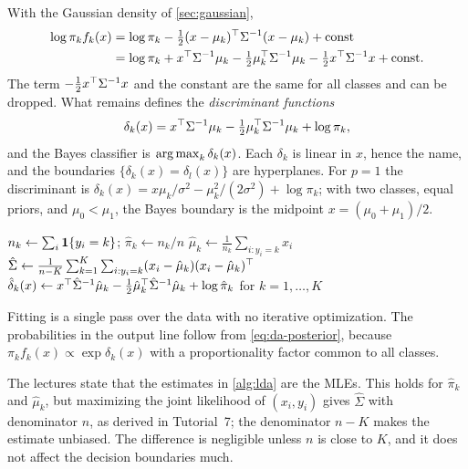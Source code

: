 With the Gaussian density of \cref{sec:gaussian},
\begin{align*}
\log\pi_kf_k(x)&=\log\pi_k-\tfrac12(x-\mu_k)^{\top}\Sigma^{-1}(x-\mu_k)+\text{const}\\
&=\log\pi_k+x^{\top}\Sigma^{-1}\mu_k-\tfrac12\mu_k^{\top}\Sigma^{-1}\mu_k-\tfrac12x^{\top}\Sigma^{-1}x+\text{const}.
\end{align*}
The term $-\frac12x^{\top}\Sigma^{-1}x$ and the constant are the same for all classes and can be dropped. What remains defines the \emph{discriminant functions}
\begin{equation}\label{eq:lda-discriminant}
\delta_k(x)=x^{\top}\Sigma^{-1}\mu_k-\tfrac12\mu_k^{\top}\Sigma^{-1}\mu_k+\log\pi_k,
\end{equation}
and the Bayes classifier is $\operatorname*{arg\,max}_k\delta_k(x)$. Each $\delta_k$ is linear in $x$, hence the name, and the boundaries $\{\delta_k(x)=\delta_l(x)\}$ are hyperplanes. For $p=1$ the discriminant is $\delta_k(x)=x\mu_k/\sigma^2-\mu_k^2/(2\sigma^2)+\log\pi_k$; with two classes, equal priors, and $\mu_0<\mu_1$, the Bayes boundary is the midpoint $x=(\mu_0+\mu_1)/2$.

\begin{algorithm}[H]
\caption{Linear Discriminant Analysis}\label{alg:lda}
\begin{algorithmic}[1]
  \State $n_k\gets\sum_i\mathbf{1}\{y_i=k\}$; \quad $\hat\pi_k\gets n_k/n$
  \State $\hat\mu_k\gets\frac1{n_k}\sum_{i:y_i=k}x_i$ 
\EndFor
\State $\hat\Sigma\gets\frac1{n-K}\sum_{k=1}^K\sum_{i:y_i=k}(x_i-\hat\mu_k)(x_i-\hat\mu_k)^{\top}$ 
\State $\hat\delta_k(x)\gets x^{\top}\hat\Sigma^{-1}\hat\mu_k-\frac12\hat\mu_k^{\top}\hat\Sigma^{-1}\hat\mu_k+\log\hat\pi_k$ for $k=1,\dots,K$
\end{algorithmic}
\end{algorithm}

Fitting is a single pass over the data with no iterative optimization. The probabilities in the output line follow from \eqref{eq:da-posterior}, because $\pi_kf_k(x)\propto\exp\delta_k(x)$ with a proportionality factor common to all classes.

\begin{remark}
The lectures state that the estimates in \cref{alg:lda} are the MLEs. This holds for $\hat\pi_k$ and $\hat\mu_k$, but maximizing the joint likelihood of $(x_i,y_i)$ gives $\hat\Sigma$ with denominator $n$, as derived in Tutorial~7; the denominator $n-K$ makes the estimate unbiased. The difference is negligible unless $n$ is close to $K$, and it does not affect the decision boundaries much.
\end{remark}

